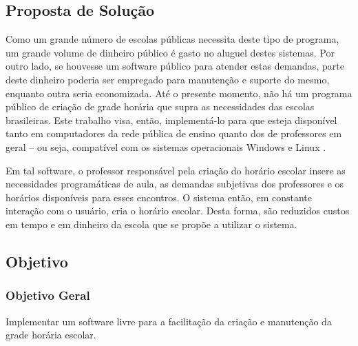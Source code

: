 \documentclass{subfiles}
\begin{document}
\subsection{Proposta de Solução}

	 \par Como um grande número de escolas públicas necessita deste tipo de programa, um grande volume de dinheiro público é gasto no aluguel destes sistemas. Por outro lado, se houvesse um software público para atender estas demandas, parte deste dinheiro poderia ser empregado para manutenção e suporte do mesmo, enquanto outra seria economizada. Até o presente momento, não há um programa público \cite{publico} de criação de grade horária que supra as necessidades das escolas brasileiras. Este trabalho visa, então, implementá-lo para que esteja disponível tanto em computadores da rede pública de ensino quanto dos de professores em geral -- ou seja, compatível com os sistemas operacionais Windows e Linux \cite{proinfo,w3s}.

	 \par Em tal software, o professor responsável pela criação do horário escolar insere as necessidades programáticas de aula, as demandas subjetivas dos professores e os horários disponíveis para esses encontros. O sistema então, em constante interação com o usuário, cria o horário escolar.  Desta forma, são reduzidos custos em tempo e em dinheiro da escola que se propõe a utilizar o sistema.

\subsection{Objetivo}

	\subsubsection{Objetivo Geral}

		\par Implementar um software livre para a facilitação da criação e manutenção da grade horária escolar.

\end{document}
